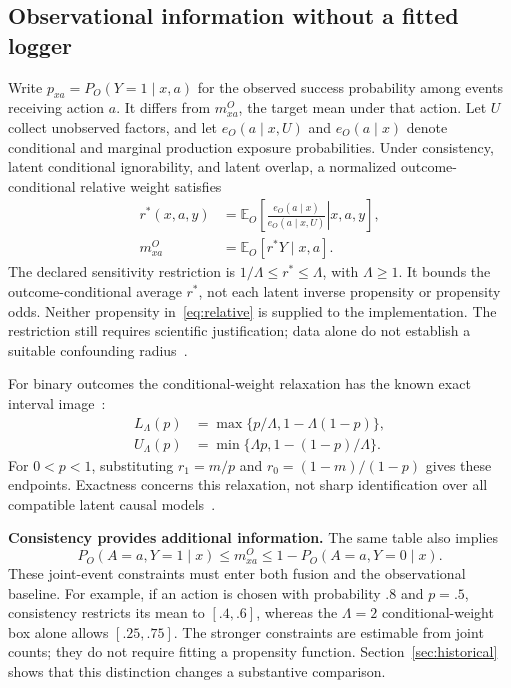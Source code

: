 \documentclass[conference]{IEEEtran}
\newcommand{\E}{\mathbb{E}}
\begin{document}
\subsection{Observational information without a fitted logger}
Write $p_{xa}=P_O(Y=1\mid x,a)$ for the observed success probability among events receiving action $a$. It differs from $m^O_{xa}$, the target mean under that action. Let $U$ collect unobserved factors, and let $e_O(a\mid x,U)$ and $e_O(a\mid x)$ denote conditional and marginal production exposure probabilities. Under consistency, latent conditional ignorability, and latent overlap, a normalized outcome-conditional relative weight satisfies
\begin{align}
 r^*(x,a,y)&=\E_O\!\left[\left.\frac{e_O(a\mid x)}{e_O(a\mid x,U)}\right|x,a,y\right],\nonumber\\
 m^O_{xa}&=\E_O[r^*Y\mid x,a].\label{eq:relative}
\end{align}
The declared sensitivity restriction is $1/\Lambda\le r^*\le\Lambda$, with $\Lambda\ge1$. It bounds the outcome-conditional average $r^*$, not each latent inverse propensity or propensity odds. Neither propensity in~\eqref{eq:relative} is supplied to the implementation. The restriction still requires scientific justification; data alone do not establish a suitable confounding radius~\cite{fawkes2025hardness}.

For binary outcomes the conditional-weight relaxation has the known exact interval image~\cite[Eq.~(9)]{dorn2025dvds}:
\begin{align}
 L_\Lambda(p)&=\max\{p/\Lambda,1-\Lambda(1-p)\},\nonumber\\
 U_\Lambda(p)&=\min\{\Lambda p,1-(1-p)/\Lambda\}.\label{eq:binary}
\end{align}
For $0<p<1$, substituting $r_1=m/p$ and $r_0=(1-m)/(1-p)$ gives these endpoints. Exactness concerns this relaxation, not sharp identification over all compatible latent causal models~\cite{ishikawa2026convex}.

\textbf{Consistency provides additional information.} The same table also implies
\begin{equation}
 P_O(A=a,Y=1\mid x)\le m^O_{xa}\le1-P_O(A=a,Y=0\mid x).\label{eq:consistency}
\end{equation}
These joint-event constraints must enter both fusion and the observational baseline. For example, if an action is chosen with probability $.8$ and $p=.5$, consistency restricts its mean to $[.4,.6]$, whereas the $\Lambda=2$ conditional-weight box alone allows $[.25,.75]$. The stronger constraints are estimable from joint counts; they do not require fitting a propensity function. Section~\ref{sec:historical} shows that this distinction changes a substantive comparison.
\end{document}
